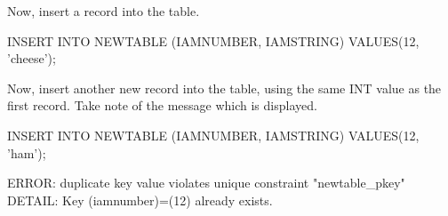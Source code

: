 Now, insert a record into the table.
\begin{sql}
INSERT INTO NEWTABLE (IAMNUMBER, IAMSTRING) VALUES(12, 'cheese');
\end{sql}
Now, insert another new record into the table, using the same INT value as the first record. Take note of the message which is displayed.
\begin{sql}
INSERT INTO NEWTABLE (IAMNUMBER, IAMSTRING) VALUES(12, 'ham');
\end{sql}
\begin{pseudo*}
ERROR:  duplicate key value violates unique constraint "newtable_pkey"
DETAIL:  Key (iamnumber)=(12) already exists.
\end{pseudo*}
